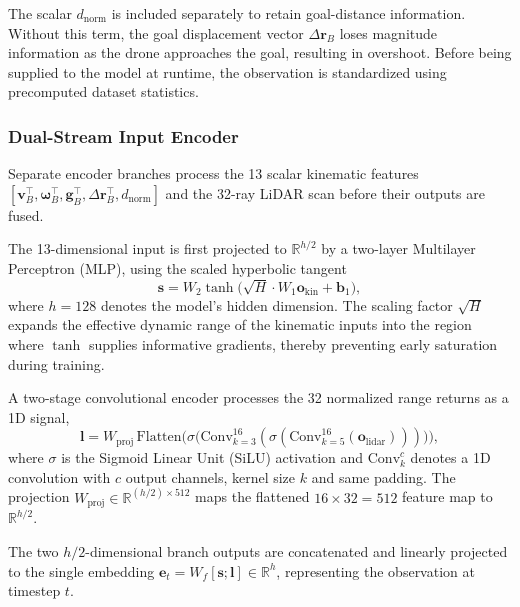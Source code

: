 \documentclass[12pt, a4paper]{article}
\begin{document}
The scalar $d_{\mathrm{norm}}$ is included separately to retain goal-distance information.
Without this term, the goal displacement vector $\Delta\mathbf{r}_B$ loses magnitude information as the drone approaches the goal, resulting in overshoot.
Before being supplied to the model at runtime, the observation is standardized using precomputed dataset statistics.


\subsubsection{Dual-Stream Input Encoder}
\label{sec:encoder}

Separate encoder branches process the 13 scalar kinematic features $[\mathbf{v}_B^{\top}, \boldsymbol{\omega}_B^{\top}, \mathbf{g}_B^{\top}, \Delta\mathbf{r}_B^{\top}, d_{\mathrm{norm}}]$ and the 32-ray LiDAR scan before their outputs are fused.

The 13-dimensional input is first projected to $\mathbb{R}^{h/2}$ by a two-layer Multilayer Perceptron (MLP), using the scaled hyperbolic tangent
\begin{equation}
    \mathbf{s} = W_2 \tanh\!\bigl(\sqrt{H}\cdot W_1 \mathbf{o}_{\mathrm{kin}} + \mathbf{b}_1\bigr),
\end{equation}
where $h = 128$ denotes the model's hidden dimension.
The scaling factor $\sqrt{H}$ expands the effective dynamic range of the kinematic inputs into the region where $\tanh$ supplies informative gradients, thereby preventing early saturation during training.

A two-stage convolutional encoder processes the 32 normalized range returns as a 1D signal,
\begin{equation}
    \mathbf{l} = W_{\mathrm{proj}}\,
        \mathrm{Flatten}\!\bigl(
            \sigma\!\bigl(\mathrm{Conv}_{k=3}^{16}(
                \sigma(\mathrm{Conv}_{k=5}^{16}(\mathbf{o}_{\mathrm{lidar}})))\bigr)
        \bigr),
\end{equation}
where $\sigma$ is the Sigmoid Linear Unit (SiLU) activation and $\mathrm{Conv}_{k}^{c}$ denotes a 1D convolution with $c$ output channels, kernel size $k$ and same padding.
The projection $W_{\mathrm{proj}} \in \mathbb{R}^{(h/2) \times 512}$ maps the flattened $16 \times 32 = 512$ feature map to $\mathbb{R}^{h/2}$.

The two $h/2$-dimensional branch outputs are concatenated and linearly projected to the single embedding $\mathbf{e}_t = W_f[\mathbf{s}; \mathbf{l}] \in \mathbb{R}^{h}$, representing the observation at timestep $t$.
\end{document}
